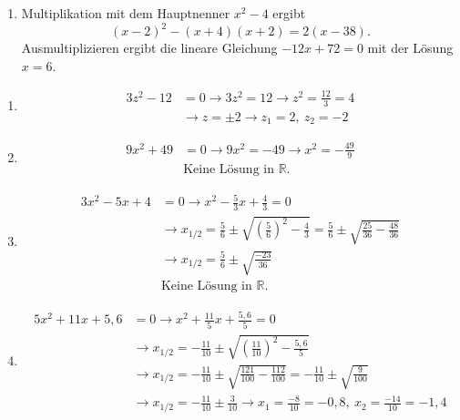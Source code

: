 \begin{enumerate}[label=\alph*)]
\begin{align*}
      \rightarrow (2x-1)(3x+1) &= (6x-1)(x-2)\\
      \rightarrow (2x \cdot 3x) + (2x \cdot 1) - (1 \cdot 3x) - (1 \cdot 1) &= (6x \cdot x) - (6x \cdot 2) - (1 \cdot x) + (1 \cdot 2)\\
      \rightarrow 6x^2 + 2x - 3x - 1 &= 6x^2 - 12x - x + 2\\
      \rightarrow 6x^2 - x - 1 &= 6x^2 - 13x + 2\\
      \rightarrow 6x^2 - x - 1 - 6x^2 + 13x - 2 &= 0\\
      \rightarrow 12x - 3 &= 0 \rightarrow 12x = 3 \rightarrow x = \frac{3}{12} \rightarrow x = \frac{1}{4}
    \end{align*}
  \item Multiplikation mit dem Hauptnenner $x^2 - 4$ ergibt
    \[ (x-2)^2 - (x+4)(x+2) = 2(x-38) . \]
    Ausmultiplizieren ergibt die lineare Gleichung $-12x + 72 = 0$ mit der Lösung $x = 6$.
\end{enumerate}

\begin{enumerate}[label=\alph*)]
  \item \begin{align*}
      3z^2 - 12 &= 0 \rightarrow 3z^2 = 12 \rightarrow z^2 = \frac{12}{3} = 4\\
      &\rightarrow z = \pm 2 \rightarrow z_1 = 2,\ z_2 = -2
    \end{align*}
  \item \begin{align*}
      9x^2 + 49 &= 0 \rightarrow 9x^2 = -49 \rightarrow x^2 = -\frac{49}{9}\\
      &\text{Keine Lösung in } \mathbb{R}.
    \end{align*}
  \item \begin{align*}
      3x^2 - 5x + 4 &= 0 \rightarrow x^2 - \frac{5}{3}x + \frac{4}{3} = 0\\
      &\rightarrow x_{1/2} = \frac{5}{6} \pm \sqrt{\left(\frac{5}{6}\right)^2 - \frac{4}{3}} = \frac{5}{6} \pm \sqrt{\frac{25}{36} - \frac{48}{36}}\\
      &\rightarrow x_{1/2} = \frac{5}{6} \pm \sqrt{\frac{-23}{36}}\\
      &\text{Keine Lösung in } \mathbb{R}.
    \end{align*}
  \item \begin{align*}
      5x^2 + 11x + 5{,}6 &= 0 \rightarrow x^2 + \frac{11}{5}x + \frac{5{,}6}{5} = 0\\
      &\rightarrow x_{1/2} = -\frac{11}{10} \pm \sqrt{\left(\frac{11}{10}\right)^2 - \frac{5{,}6}{5}}\\
      &\rightarrow x_{1/2} = -\frac{11}{10} \pm \sqrt{\frac{121}{100} - \frac{112}{100}} = -\frac{11}{10} \pm \sqrt{\frac{9}{100}}\\
      &\rightarrow x_{1/2} = -\frac{11}{10} \pm \frac{3}{10} \rightarrow x_1 = \frac{-8}{10} = -0{,}8,\ x_2 = \frac{-14}{10} = -1{,}4
    \end{align*}
\end{enumerate}

